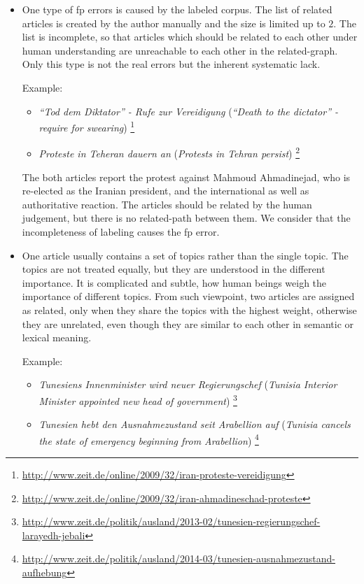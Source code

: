 \begin{itemize}
    \item One type of fp errors is caused by the labeled corpus. The list of related articles is created by the author manually and the size is limited up to $2$. The list is incomplete, so that articles which should be related to each other under human understanding are unreachable to each other in the related-graph. Only this type is not the real errors but the inherent systematic lack. 
    
    Example: 
    \begin{itemize}
        \item \textit{``Tod dem Diktator'' - Rufe zur Vereidigung} (\textit{``Death to the dictator'' - require for swearing}) \footnote{\url{http://www.zeit.de/online/2009/32/iran-proteste-vereidigung}}
        \item \textit{Proteste in Teheran dauern an} (\textit{Protests in Tehran persist}) \footnote{\url{http://www.zeit.de/online/2009/32/iran-ahmadineschad-proteste}}
    \end{itemize}
    The both articles report the protest against Mahmoud Ahmadinejad, who is re-elected as the Iranian president, and the international as well as authoritative reaction. The articles should be related by the human judgement, but there is no related-path between them. We consider that the incompleteness of labeling causes the fp error. 
    
    \item One article usually contains a set of topics rather than the single topic. The topics are not treated equally, but they are understood in the different importance. It is complicated and subtle, how human beings weigh the importance of different topics. From such viewpoint, two articles are assigned as related, only when they share the topics with the highest weight, otherwise they are unrelated, even though they are similar to each other in semantic or lexical meaning. 
    
    Example:
    \begin{itemize}
        \item \textit{Tunesiens Innenminister wird neuer Regierungschef} (\textit{Tunisia Interior Minister appointed new head of government}) \footnote{\url{http://www.zeit.de/politik/ausland/2013-02/tunesien-regierungschef-larayedh-jebali}}
        \item \textit{Tunesien hebt den Ausnahmezustand seit Arabellion auf} (\textit{Tunisia cancels the state of emergency beginning from Arabellion}) \footnote{\url{http://www.zeit.de/politik/ausland/2014-03/tunesien-ausnahmezustand-aufhebung}}
    \end{itemize}
    

\end{itemize}
